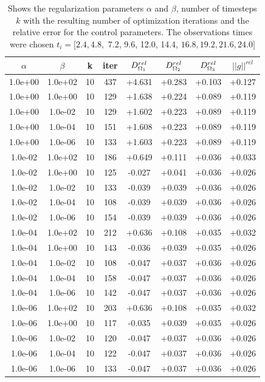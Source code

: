 \documentclass[11pt,a4paper]{article}
\begin{document}
\begin{table}
\centering
\caption{Shows the regularization parameters $\alpha$ and $\beta$, number of timesteps $k$ with the resulting number of optimization iterations and the relative error for the control parameters. The observations times were chosen $ t_i=[2.4, 4.8,$ 7.2, 9.6, 12.0, 14.4, $16.8, 19.2, 21.6, 24.0]$ }
\begin{tabular}{*{8}c}
$\alpha$ & $\beta$ & k  & iter & $ D_{\Omega_1}\sp{rel}$ & $ D_{\Omega_2}\sp{rel} $ & $D_{\Omega_3}\sp{rel}$ & $||g||^{rel}$ \\
\hline 
 1.0e+00 	 & 1.0e+02 	 & 10 & 437 	 & +4.631 & +0.283 & +0.103 & +0.127 \\ 
 1.0e+00 	 & 1.0e+00 	 & 10 & 129 	 & +1.638 & +0.224 & +0.089 & +0.119 \\ 
 1.0e+00 	 & 1.0e-02 	 & 10 & 129 	 & +1.602 & +0.223 & +0.089 & +0.119 \\ 
 1.0e+00 	 & 1.0e-04 	 & 10 & 151 	 & +1.608 & +0.223 & +0.089 & +0.119 \\ 
 1.0e+00 	 & 1.0e-06 	 & 10 & 133 	 & +1.603 & +0.223 & +0.089 & +0.119 \\ 
 \hline
 1.0e-02 	 & 1.0e+02 	 & 10 & 186 	 & +0.649 & +0.111 & +0.036 & +0.033 \\ 
 1.0e-02 	 & 1.0e+00 	 & 10 & 125 	 & -0.027 & +0.041 & +0.036 & +0.026 \\ 
 1.0e-02 	 & 1.0e-02 	 & 10 & 133 	 & -0.039 & +0.039 & +0.036 & +0.026 \\ 
 1.0e-02 	 & 1.0e-04 	 & 10 & 108 	 & -0.039 & +0.039 & +0.036 & +0.026 \\ 
 1.0e-02 	 & 1.0e-06 	 & 10 & 154 	 & -0.039 & +0.039 & +0.036 & +0.026 \\ 
 \hline
 1.0e-04 	 & 1.0e+02 	 & 10 & 212 	 & +0.636 & +0.108 & +0.035 & +0.032 \\ 
 1.0e-04 	 & 1.0e+00 	 & 10 & 143 	 & -0.036 & +0.039 & +0.035 & +0.026 \\ 
 1.0e-04 	 & 1.0e-02 	 & 10 & 108 	 & -0.047 & +0.037 & +0.036 & +0.026 \\ 
 1.0e-04 	 & 1.0e-04 	 & 10 & 158 	 & -0.047 & +0.037 & +0.036 & +0.026 \\ 
 1.0e-04 	 & 1.0e-06 	 & 10 & 142 	 & -0.047 & +0.037 & +0.036 & +0.026 \\ 
 \hline
 1.0e-06 	 & 1.0e+02 	 & 10 & 203 	 & +0.636 & +0.108 & +0.035 & +0.032 \\ 
 1.0e-06 	 & 1.0e+00 	 & 10 & 117 	 & -0.035 & +0.039 & +0.035 & +0.026 \\ 
 1.0e-06 	 & 1.0e-02 	 & 10 & 120 	 & -0.047 & +0.037 & +0.036 & +0.026 \\ 
 1.0e-06 	 & 1.0e-04 	 & 10 & 122 	 & -0.047 & +0.037 & +0.036 & +0.026 \\ 
 1.0e-06 	 & 1.0e-06 	 & 10 & 133 	 & -0.047 & +0.037 & +0.036 & +0.026 \\ 

\end{tabular}
\label{Tab::1}
\end{table} 
\end{document}
